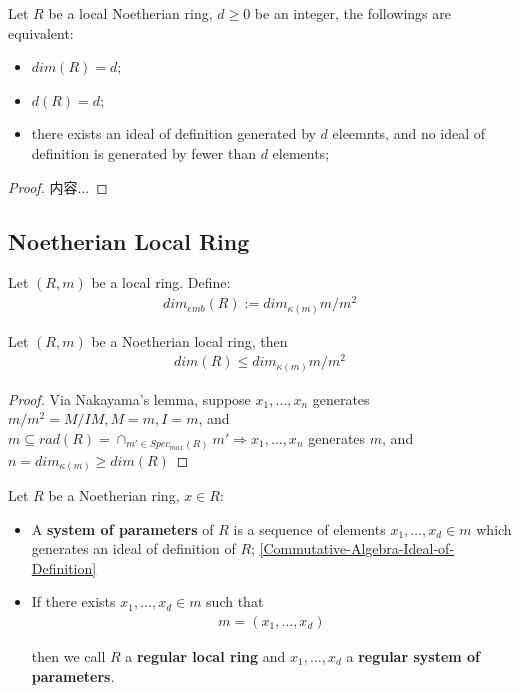 \documentclass[Total.tex]{subfiles}
\begin{document}
			\begin{proposition}
				Let $R$ be a local Noetherian ring, $d\geq 0$ be an integer, the followings are equivalent:
				\begin{itemize}
					\item $dim(R)=d$;
					\item $d(R)=d$;
					\item there exists an ideal of definition generated by $d$ eleemnts, and no ideal of definition is generated by fewer than $d$ elements;
				\end{itemize}
			\end{proposition}
			\begin{proof}
				内容...
			\end{proof}
			
			\subsection{Noetherian Local Ring}
				\begin{Def}
					Let $(R,m)$ be a local ring. Define:
					\begin{gather*}
						dim_{emb}(R):=dim_{\kappa(m)} m/m^2
					\end{gather*}
				\end{Def}
				
				\begin{lemma}
					Let $(R,m)$ be a Noetherian local ring, then 
					\begin{gather*}
						dim(R)\leq dim_{\kappa(m)} m/m^2
					\end{gather*}
				\end{lemma}
				\begin{proof}
					Via Nakayama's lemma, suppose $x_1,\dots,x_n$ generates $m/m^2=M/IM,M=m,I=m$, and $m\subseteq rad(R)=\cap_{m'\in Spec_{max}(R)} m'\Rightarrow x_1,\dots,x_n$ generates $m$, and $n=dim_{\kappa(m)}\geq dim(R)$
				\end{proof}
				
				\begin{Def}
					Let $R$ be a Noetherian ring, $x\in R$:
					\begin{itemize}
						\item A \textbf{system of parameters} of $R$ is a sequence of elements $x_1,\dots,x_d\in m$ which generates an ideal of definition of $R$; \ref{Commutative-Algebra-Ideal-of-Definition}
						\item If there exists $x_1,\dots,x_d\in m$ such that
						\begin{gather*}
							m=(x_1,\dots,x_d)
						\end{gather*}
						
						then we call $R$ a \textbf{regular local ring} and $x_1,\dots,x_d$ a \textbf{regular system of parameters}.
					\end{itemize}
				\end{Def}
				
\end{document}

